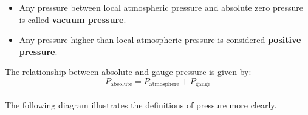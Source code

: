 \documentclass{article}
\begin{document}
\begin{itemize}
	\item Any pressure between local atmospheric pressure and absolute zero pressure is called \textbf{vacuum pressure}.
	\item Any pressure higher than local atmospheric pressure is considered \textbf{positive pressure}.
\end{itemize}
\vspace{0.7em}\noindent
The relationship between absolute and gauge pressure is given by:\\[0.5em]
\begin{equation}
	P_{\text{absolute}} = P_{\text{atmosphere}} + P_{\text{gauge}}
	\label{eq:absolute}
\end{equation}\\
\vspace{0.5em}
The following diagram illustrates the definitions of pressure more clearly.\\[8pt]	
\end{document}
